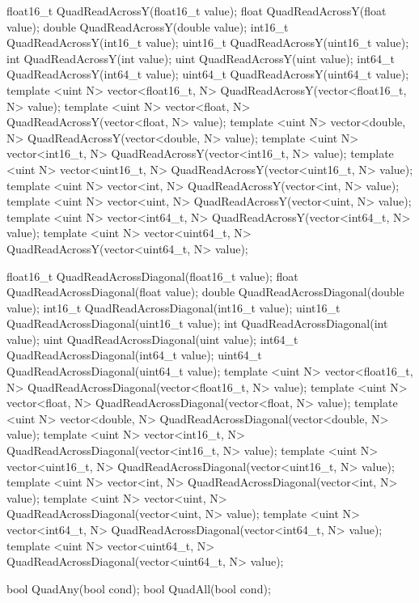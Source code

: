 \begin{HLSL}
float16_t QuadReadAcrossY(float16_t value);
float QuadReadAcrossY(float value);
double QuadReadAcrossY(double value);
int16_t QuadReadAcrossY(int16_t value);
uint16_t QuadReadAcrossY(uint16_t value);
int QuadReadAcrossY(int value);
uint QuadReadAcrossY(uint value);
int64_t QuadReadAcrossY(int64_t value);
uint64_t QuadReadAcrossY(uint64_t value);
template <uint N> vector<float16_t, N> QuadReadAcrossY(vector<float16_t, N> value);
template <uint N> vector<float, N> QuadReadAcrossY(vector<float, N> value);
template <uint N> vector<double, N> QuadReadAcrossY(vector<double, N> value);
template <uint N> vector<int16_t, N> QuadReadAcrossY(vector<int16_t, N> value);
template <uint N> vector<uint16_t, N> QuadReadAcrossY(vector<uint16_t, N> value);
template <uint N> vector<int, N> QuadReadAcrossY(vector<int, N> value);
template <uint N> vector<uint, N> QuadReadAcrossY(vector<uint, N> value);
template <uint N> vector<int64_t, N> QuadReadAcrossY(vector<int64_t, N> value);
template <uint N> vector<uint64_t, N> QuadReadAcrossY(vector<uint64_t, N> value);

float16_t QuadReadAcrossDiagonal(float16_t value);
float QuadReadAcrossDiagonal(float value);
double QuadReadAcrossDiagonal(double value);
int16_t QuadReadAcrossDiagonal(int16_t value);
uint16_t QuadReadAcrossDiagonal(uint16_t value);
int QuadReadAcrossDiagonal(int value);
uint QuadReadAcrossDiagonal(uint value);
int64_t QuadReadAcrossDiagonal(int64_t value);
uint64_t QuadReadAcrossDiagonal(uint64_t value);
template <uint N> vector<float16_t, N> QuadReadAcrossDiagonal(vector<float16_t, N> value);
template <uint N> vector<float, N> QuadReadAcrossDiagonal(vector<float, N> value);
template <uint N> vector<double, N> QuadReadAcrossDiagonal(vector<double, N> value);
template <uint N> vector<int16_t, N> QuadReadAcrossDiagonal(vector<int16_t, N> value);
template <uint N> vector<uint16_t, N> QuadReadAcrossDiagonal(vector<uint16_t, N> value);
template <uint N> vector<int, N> QuadReadAcrossDiagonal(vector<int, N> value);
template <uint N> vector<uint, N> QuadReadAcrossDiagonal(vector<uint, N> value);
template <uint N> vector<int64_t, N> QuadReadAcrossDiagonal(vector<int64_t, N> value);
template <uint N> vector<uint64_t, N> QuadReadAcrossDiagonal(vector<uint64_t, N> value);

bool QuadAny(bool cond);
bool QuadAll(bool cond);
\end{HLSL}


